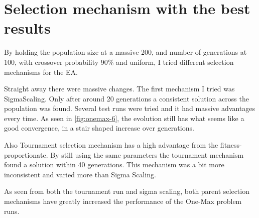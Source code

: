 \section{Selection mechanism with the best results}
By holding the population size at a massive 200, and number of generations at 100, with crossover
probability 90\% and uniform, I tried different selection mechanisms for the EA. 

Straight away there were massive changes. The first mechanism I tried was SigmaScaling. Only after
around 20 generations a consistent solution across the population was found. Several test runs were tried
and it had massive advantages every time. As seen in \autoref{fig:onemax-6}, the evolution still has what
seems like a good convergence, in a stair shaped increase over generations.


Also Tournament selection mechanism has a high advantage from the fitness-proportionate. By still using
the same parameters the tournament mechanism found a solution within 40 generations. This mechanism
was a bit more inconsistent and varied more than Sigma Scaling. 


As seen from both the tournament run and sigma scaling, both parent selection mechanisms have greatly
increased the performance of the One-Max problem runs.
